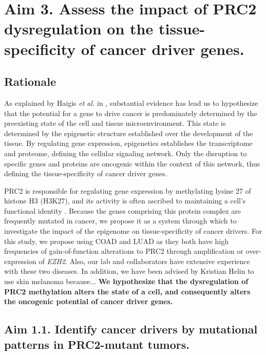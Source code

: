\section{Aim 3. Assess the impact of PRC2 dysregulation on the tissue-specificity of cancer driver genes.}

\subsection*{Rationale}

As explained by Haigis \emph{et al.} in \cite{Haigis2019}, substantial evidence has lead us to hypothesize that the potential for a gene to drive cancer is predominately determined by the preexisting state of the cell and tissue microenvironment.
This state is determined by the epigenetic structure established over the development of the tissue.
By regulating gene expression, epigenetics establishes the transcriptome and proteome, defining the cellular signaling network.
Only the disruption to specific genes and proteins are oncogenic within the context of this network, thus defining the tissue-specificity of cancer driver genes.

PRC2 is responsible for regulating gene expression by methylating lysine 27 of histone H3 (H3K27), and its activity is often ascribed to maintaining a cell's functional identity \cite{Comet2016MaintainingCancer., Laugesen2019a}.
Because the genes comprising this protein complex are frequently mutated in cancer, we propose it as a system through which to investigate the impact of the epigenome on tissue-specificity of cancer drivers.
For this study, we propose using COAD and LUAD as they both have high frequencies of gain-of-function alterations to PRC2 through amplification or over-expression of \emph{EZH2}.
Also, our lab and collaborators have extensive experience with these two diseases.
In addition, we have been advised by Kristian Helin to use skin melanoma because...
\textbf{We hypothesize that the dysregulation of PRC2 methylation alters the state of a cell, and consequently alters the oncogenic potential of cancer driver genes.}


\subsection*{Aim 1.1. Identify cancer drivers by mutational patterns in PRC2-mutant tumors.}


